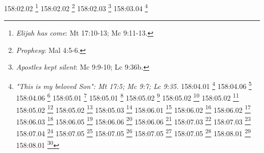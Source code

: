 {{{{{{{{{{{{{{{{{{{{{{{{{{{{{{{{{{{158:02.02 \footnote{\textit{Elijah has come}: Mt 17:10-13; Mc 9:11-13.}
158:02.02 \footnote{\textit{Prophesy}: Mal 4:5-6.}
158:02.03 \footnote{\textit{Apostles kept silent}: Mc 9:9-10; Lc 9:36b.}
158:03.04 \footnote{\textit{"This is my beloved Son": Mt 17:5; Mc 9:7; Lc 9:35.}
158:04.01 \footnote{\textit{Gathering crowd}: Mc 9:14; Lc 9:37.}
158:04.06 \footnote{\textit{"Keys of the kingdom"}: Mt 16:19.}
158:04.06 \footnote{\textit{Apostles' failure to exorcise}: Mt 17:16; Mc 9:18b; Lc 9:40.}
158:05.01 \footnote{\textit{Epileptic demoniac}: Mt 17:14-16; Mc 9:15-18; Lc 9:38-40.}
158:05.01 \footnote{\textit{Falls in water and fire}: Mt 17:15; Mc 9:22.}
158:05.02 \footnote{\textit{All things possible to believers}: Gn 18:14; Jer 32:27; Mt 19:26; Mc 10:27; 14:36; Lc 1:37; 18:27.}
158:05.02 \footnote{\textit{Boy has convulsions}: Lc 9:42a.}
158:05.02 \footnote{\textit{Faith and doubt}: Mc 9:20-24.}
158:05.02 \footnote{\textit{I believe, help thou my unbelief}: Mc 9:24.}
158:05.02 \footnote{\textit{Oh faithless & perverse generation}: Mt 17:17; Mc 9:19; Lc 9:41.}
158:05.03 \footnote{\textit{Boy cured}: Mt 17:18; Mc 9:25-27; Lc 9:42b-43a.}
158:06.01 \footnote{\textit{Disciples ask why defeat}: Mt 17:19; Mc 9:28.}
158:06.02 \footnote{\textit{Kingdom not of world}: Lc 17:20-21; Jn 18:36; Ro 14:17.}
158:06.02 \footnote{\textit{Little faith}: Mt 17:20a; Mc 9:29.}
158:06.03 \footnote{\textit{Greatest must be server}: Mt 20:26; Mt 23:11-12; Mc 9:35; 10:43-44; Lc 22:26.}
158:06.05 \footnote{\textit{Foretelling passion}: Mt 16:21; 17:22-23a; 20:17-19; 27:63; Mc 8:31; 9:31; 10:32-34; Lc 9:22,31,43b-44; 18:31-33; 24:7,46; Jn 14:28a; 20:9.}
158:06.06 \footnote{\textit{Disciples ponder meaning}: Mc 9:32; Lc 9:45.}
158:06.06 \footnote{\textit{Disciples sorrowful}: Mt 17:23b.}
158:07.03 \footnote{\textit{Apostles hear passion again}: Mt 16:21; 17:22-23a; 20:17-19; 27:63; Mc 8:31; 9:31; 10:32-34; Lc 9:22,31,43b-44; 18:31-33; 24:7,46; Jn 14:28a; 20:9.}
158:07.03 \footnote{\textit{Peter protests}: Mt 16:22; Mc 8:32.}
158:07.04 \footnote{\textit{Jesus rebukes Peter}: Mt 16:23; Mc 8:33.}
158:07.05 \footnote{\textit{Cost of discipleship}: Mt 16:24-28; Mc 8:34-38; Lc 9:23-27.}
158:07.05 \footnote{\textit{Many see kingdom come}: Mc 9:1.}
158:07.05 \footnote{\textit{Save life selfishly, lose it}: Mt 10:39; 16:25; Mc 8:35; Lc 9:24; 17:33.}
158:07.05 \footnote{\textit{Take up responsibilities, follow me}: Mt 10:38; 16:24; Mc 8:34; 10:21; Lc 9:23-26; 14:27.}
158:08.01 \footnote{\textit{Cut off offending parts}: Mc 9:43-47.}
158:08.01 \footnote{\textit{Enter like child}: Mt 18:2-4; 19:13-14; Mc 9:36-37; 10:13-15; Lc 9:47-48; 18:16-17.}
}}}}}}}}}}}}}}}}}}}}}}}}}}}}}}}}}}}}
